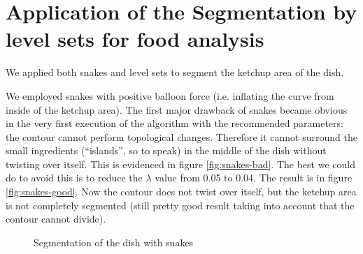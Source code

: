 \section{Application of the Segmentation by level sets for food analysis}

We applied both snakes and level sets to segment the ketchup area of the dish.

We employed snakes with positive balloon force (i.e. inflating the curve from inside of the ketchup area). The first major drawback of snakes became obvious in the very first execution of the algorithm with the recommended parameters: the contour cannot perform topological changes. Therefore it cannot surround the small ingredients (``islands'', so to speak) in the middle of the dish without twisting over itself.
This is evidenced in figure \ref{fig:snakes-bad}. The best we could do to avoid this is to reduce the $ \lambda $ value from 0.05 to 0.04. The result is in figure \ref{fig:snakes-good}. Now the contour does not twist over itself, but the ketchup area is not completely segmented (still pretty good result taking into account that the contour cannot divide).

\begin{figure}[!hbt]
\centering   
{}
\caption{Segmentation of the dish with snakes}
\label{fig:snakes-dish}
\end{figure}

